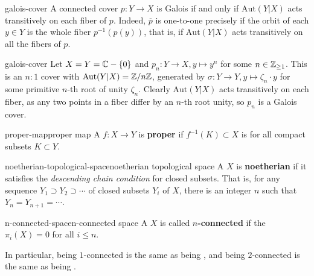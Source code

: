 \begin{example}{galois-cover}
    A connected cover $p : Y \to X$ is Galois if and only if $\text{Aut}(Y|X)$ acts transitively on each fiber of $p$. Indeed, $\overline{p}$ is one-to-one precisely if the orbit of each $y \in Y$ is the whole fiber $p^{-1}(p(y))$, that is, if $\text{Aut}(Y|X)$ acts transitively on all the fibers of $p$.
\end{example}

\begin{example}{galois-cover}
    Let $X = Y = \mathbb{C} - \{ 0 \}$ and $p_n : Y \to X, y \mapsto y^n$ for some $n \in \mathbb{Z}_{\ge 1}$. This is an $n : 1$ cover with $\text{Aut}(Y|X) = \mathbb{Z}/n\mathbb{Z}$, generated by $\sigma : Y \to Y, y \mapsto \zeta_n \cdot y$ for some primitive $n$-th root of unity $\zeta_n$. Clearly $\text{Aut}(Y|X)$ acts transitively on each fiber, as any two points in a fiber differ by an $n$-th root unity, so $p_n$ is a Galois cover.
\end{example}

\begin{topic}{proper-map}{proper map}
    A  $f : X \to Y$ is \textbf{proper} if $f^{-1}(K) \subset X$ is  for all compact subsets $K \subset Y$.
\end{topic}

\begin{topic}{noetherian-topological-space}{noetherian topological space}
    A  $X$ is \textbf{noetherian} if it satisfies the \textit{descending chain condition} for closed subsets. That is, for any sequence $Y_1 \supset Y_2 \supset \cdots$ of closed subsets $Y_i$ of $X$, there is an integer $n$ such that $Y_n = Y_{n + 1} = \cdots$.
\end{topic}

\begin{topic}{n-connected-space}{n-connected space}
    A  $X$ is called \textbf{$n$-connected} if the  $\pi_i(X) = 0$ for all $i \le n$.
    
    In particular, being $1$-connected is the same as being , and being $2$-connected is the same as being .
\end{topic}

